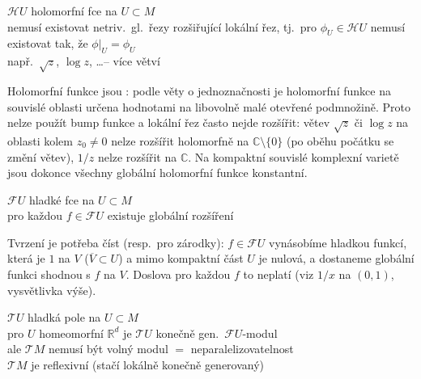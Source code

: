 \begin{priklad}
$\mathcal{H}U$ \quad holomorfní fce na $U\subset M$ \\
nemusí existovat netriv.\ gl.\ řezy rozšiřující lokální řez, tj.\ pro $\phi_U\in\mathcal{H}U$ nemusí existovat
 tak, že $\phi|_U = \phi_U$ \\
\quad např.\ $\sqrt z$, $\log z$, \dots \quad -- více větví
\end{priklad}

\begin{vysvetleni}
Holomorfní funkce jsou : podle věty o jednoznačnosti je holomorfní funkce na souvislé oblasti určena hodnotami na libovolně malé otevřené podmnožině.
Proto nelze použít bump funkce a lokální řez často nejde rozšířit: větev $\sqrt z$ či $\log z$ na oblasti kolem $z_0\neq0$ nelze rozšířit holomorfně
na $\mathbb{C}\setminus\{0\}$ (po oběhu počátku se změní větev), $1/z$ nelze rozšířit na $\mathbb{C}$. Na kompaktní souvislé komplexní varietě jsou dokonce
všechny globální holomorfní funkce konstantní.
\end{vysvetleni}

\begin{priklad}
$\mathcal{F}U$ \quad hladké fce na $U\subset M$ \\
pro každou $f\in\mathcal{F}U$ existuje globální rozšíření
\end{priklad}

\begin{vysvetleni}[Upřesnění]
Tvrzení je potřeba číst  (resp.\ pro zárodky): $f\in\mathcal{F}U$ vynásobíme hladkou funkcí, která je $1$ na $V$ ($\overline V\subset U$)
a mimo kompaktní část $U$ je nulová, a dostaneme globální funkci shodnou s $f$ na $V$. Doslova pro každou $f$ to neplatí (viz $1/x$ na $(0,1)$, vysvětlivka výše).
\end{vysvetleni}

\begin{priklad}
$\mathcal{T}U$ \quad hladká pole na $U\subset M$ \\
pro $U$ homeomorfní $\mathbb{R}^d$ je $\mathcal{T}U$ konečně gen.\ $\mathcal{F}U$-modul \\
ale $\mathcal{T}M$ nemusí být volný modul $=$ neparalelizovatelnost \\
$\mathcal{T}M$ je reflexivní (stačí lokálně konečně generovaný)
\end{priklad}

